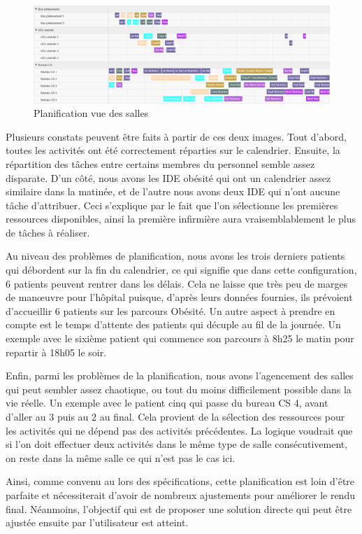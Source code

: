 \documentclass[noposter]{polytech/polytech}
\begin{document}
\begin{figure}
	\includegraphics[scale=0.25]{images/planAuto2}
	\caption{Planification vue des salles}
	\label{fig:planAuto2}
\end{figure}

Plusieurs constats peuvent être faits à partir de ces deux images. Tout d'abord, toutes les activités ont été correctement réparties sur le calendrier. Ensuite, la répartition des tâches entre certains membres du personnel semble assez disparate. D'un côté, nous avons les IDE obésité qui ont un calendrier assez similaire dans la matinée, et de l'autre nous avons deux IDE qui n'ont aucune tâche d'attribuer. Ceci s'explique par le fait que l'on sélectionne les premières ressources disponibles, ainsi la première infirmière aura vraisemblablement le plus de tâches à réaliser. 

Au niveau des problèmes de planification, nous avons les trois derniers patients qui débordent sur la fin du calendrier, ce qui signifie que dans cette configuration, 6 patients peuvent rentrer dans les délais. Cela ne laisse que très peu de marges de manœuvre pour l'hôpital puisque, d'après leurs données fournies, ils prévoient d'accueillir 6 patients sur les parcours Obésité. Un autre aspect à prendre en compte est le temps d'attente des patients qui décuple au fil de la journée. Un exemple avec le sixième patient qui commence son parcours à 8h25 le matin pour repartir à 18h05 le soir.

Enfin, parmi les problèmes de la planification, nous avons l'agencement des salles qui peut sembler assez chaotique, ou tout du moins difficilement possible dans la vie réelle. Un exemple avec le patient cinq qui passe du bureau CS 4, avant d'aller au 3 puis au 2 au final. Cela provient de la sélection des ressources pour les activités qui ne dépend pas des activités précédentes. La logique voudrait que si l'on doit effectuer deux activités dans le même type de salle consécutivement, on reste dans la même salle ce qui n'est pas le cas ici. 

Ainsi, comme convenu au lors des spécifications, cette planification est loin d'être parfaite et nécessiterait d'avoir de nombreux ajustements pour améliorer le rendu final. Néanmoins, l'objectif qui est de proposer une solution directe qui peut être ajustée ensuite par l'utilisateur est atteint.
\end{document}

